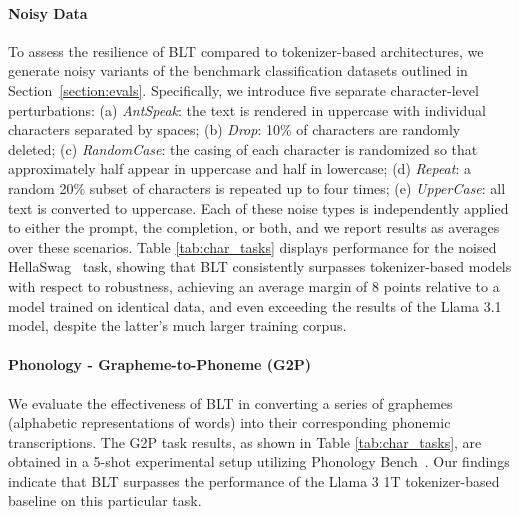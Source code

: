 \paragraph{Noisy Data} To assess the resilience of {\textsc BLT} compared to tokenizer-based architectures, we generate noisy variants of the benchmark classification datasets outlined in Section~\ref{section:evals}. Specifically, we introduce five separate character-level perturbations: (a) \textit{AntSpeak}: the text is rendered in uppercase with individual characters separated by spaces; (b) \textit{Drop}: 10\% of characters are randomly deleted; (c) \textit{RandomCase}: the casing of each character is randomized so that approximately half appear in uppercase and half in lowercase; (d) \textit{Repeat}: a random 20\% subset of characters is repeated up to four times; (e) \textit{UpperCase}: all text is converted to uppercase. Each of these noise types is independently applied to either the prompt, the completion, or both, and we report results as averages over these scenarios. Table \ref{tab:char_tasks} displays performance for the noised HellaSwag~\citep{Eval_hellaswag} task, showing that {\textsc BLT} consistently surpasses tokenizer-based models with respect to robustness, achieving an average margin of 8 points relative to a model trained on identical data, and even exceeding the results of the Llama 3.1 model, despite the latter's much larger training corpus.

\paragraph{Phonology - Grapheme-to-Phoneme (G2P)} We evaluate the effectiveness of {\textsc BLT} in converting a series of graphemes (alphabetic representations of words) into their corresponding phonemic transcriptions. The G2P task results, as shown in Table \ref{tab:char_tasks}, are obtained in a 5-shot experimental setup utilizing Phonology Bench~\citep{suvarna2024phonologybench}. Our findings indicate that {\textsc BLT} surpasses the performance of the Llama 3 1T tokenizer-based baseline on this particular task.

